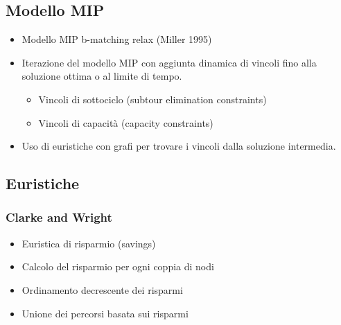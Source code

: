 \documentclass[compress]{beamer}
\begin{document}
\subsection{Modello MIP}
\begin{frame}{\subsecname}
    \begin{itemize}
        \item Modello MIP b-matching relax (Miller 1995)
        \item Iterazione del modello MIP con aggiunta dinamica di vincoli fino alla soluzione ottima o al limite di tempo.
        \begin{itemize}
            \item Vincoli di sottociclo (subtour elimination constraints) 
            \item Vincoli di capacità (capacity constraints)
        \end{itemize}
        \item Uso di euristiche con grafi per trovare i vincoli dalla soluzione intermedia.
    \end{itemize}
\end{frame}

\subsection{Euristiche}

\subsubsection{Clarke and Wright}
    
\begin{frame}{\subsubsecname}
    \begin{itemize}
        \item Euristica di risparmio (savings)
        \item Calcolo del risparmio per ogni coppia di nodi
        \item Ordinamento decrescente dei risparmi
        \item Unione dei percorsi basata sui risparmi
    \end{itemize}

\end{frame}
\end{document}
